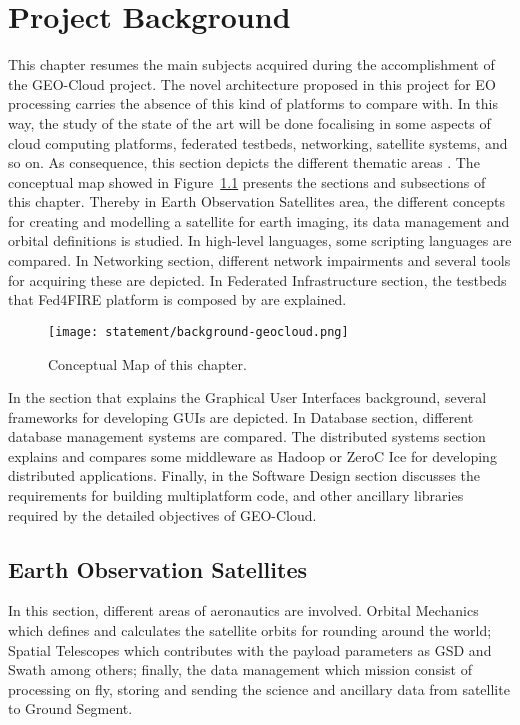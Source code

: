 \chapter{Project Background}
\label{chap:antecedentes}


This chapter resumes the main subjects acquired during the accomplishment of the GEO-Cloud project.  The novel architecture proposed in this project for EO processing carries the absence of this kind of platforms to compare with. In this way, the study of the state of the art will be done focalising in some aspects of cloud computing platforms, federated testbeds, networking, satellite systems, and so on. As consequence, this section depicts the different thematic areas .
The conceptual map showed in Figure~\ref{fig:intr-conceptual-map} presents the sections and subsections of this chapter. Thereby in Earth Observation Satellites area, the different concepts for creating and modelling a satellite for earth imaging, its data management and orbital definitions is studied. In high-level languages, some scripting languages are compared. In Networking section, different network impairments and several tools for acquiring these are depicted. In Federated Infrastructure section, the testbeds that Fed4FIRE platform is composed by are explained.

\begin{figure}[!h]
\begin{center}
\texttt{[image: statement/background-geocloud.png]}
\caption{Conceptual Map of this chapter.}
\label{fig:intr-conceptual-map}
\end{center}
\end{figure}

In the section that explains the Graphical User Interfaces background, several
frameworks for developing GUIs are depicted. In Database section, different
database management systems are compared. The distributed systems section
explains and compares some middleware as Hadoop or ZeroC Ice for developing
distributed applications.
Finally, in the Software Design section discusses the requirements for building multiplatform code, and other ancillary libraries required by the detailed objectives of GEO-Cloud.

\section{Earth Observation Satellites}

In this section, different areas of aeronautics are involved. Orbital
Mechanics which defines and calculates the satellite orbits for rounding around
the world;  Spatial Telescopes which contributes with the payload parameters as
\ac{GSD} and Swath among others; finally, the data management which mission consist of processing on fly, storing
and sending the science and ancillary data from satellite to Ground Segment.

